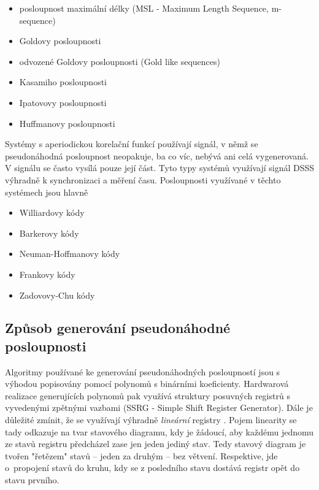 \begin{itemize}
\item posloupnost maximální délky (MSL - Maximum Length Sequence, m-sequence)
\item Goldovy posloupnosti
\item odvozené Goldovy posloupnosti (Gold like sequences)
\item Kasamiho posloupnosti
\item Ipatovovy posloupnosti
\item Huffmanovy posloupnosti
\end{itemize}


\marginpar{\textcolor{txt_blue}{Posloupnosti využívané s aperiodickou korelační funkcí}} 
Systémy s aperiodickou korelační funkcí používají signál, v němž se pseudonáhodná posloupnost neopakuje, ba co víc, nebývá ani celá vygenerovaná. V signálu se často vysílá pouze její část. Tyto typy systémů využívají signál DSSS výhradně k synchronizaci a měření času. Posloupnosti využívané v těchto systémech jsou hlavně

\begin{itemize}
\item Williardovy kódy
\item Barkerovy kódy
\item Neuman-Hoffmanovy kódy
\item Frankovy kódy
\item Zadovovy-Chu kódy
\end{itemize}






\subsection{Způsob generování pseudonáhodné posloupnosti}
Algoritmy používané ke generování pseudonáhodných posloupností jsou s výhodou popisovány pomocí polynomů s binárními koeficienty. Hardwarová realizace generujících polynomů pak využívá struktury posuvných registrů s vyvedenými zpětnými vazbami (SSRG - Simple Shift Register Generator). Dále je důležité zmínit, že se využívají výhradně \textsl{lineární} registry \cite{holmes2007}. Pojem linearity se tady odkazuje na tvar stavového diagramu, kdy je žádoucí, aby každému jednomu ze stavů registru předcházel zase jen jeden jediný stav. Tedy stavový diagram je tvořen "řetězem" stavů -- jeden za druhým -- bez větvení. Respektive, jde o~propojení stavů do kruhu, kdy se z posledního stavu dostává registr opět do stavu prvního.
 


